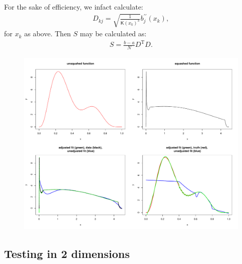 \documentclass[a4paper,10pt]{article}
\newcommand{\tr}[1]{#1^{\text{T}}}
\newcommand{\be}{\begin{eqnarray}}
\newcommand{\ee}{\end{eqnarray}}
\begin{document}
For the sake of efficiency, we infact calculate:
\be
D_{kj}=\sqrt{\frac{1}{\mathsf{K}(x_k)^3}} b^{\prime\prime}_j(x_k),
\ee
for $x_k$ as above. Then $S$ may be calculated as:
\be
S=\frac{b-a}{N}\tr{D}D.
\ee

\begin{figure}
\centering
\includegraphics[width=6in]{su-figs/1dadjust.pdf} \\
\caption{}
\label{1dadjust}
\end{figure}


\subsection{Testing in 2 dimensions}
\end{document}
